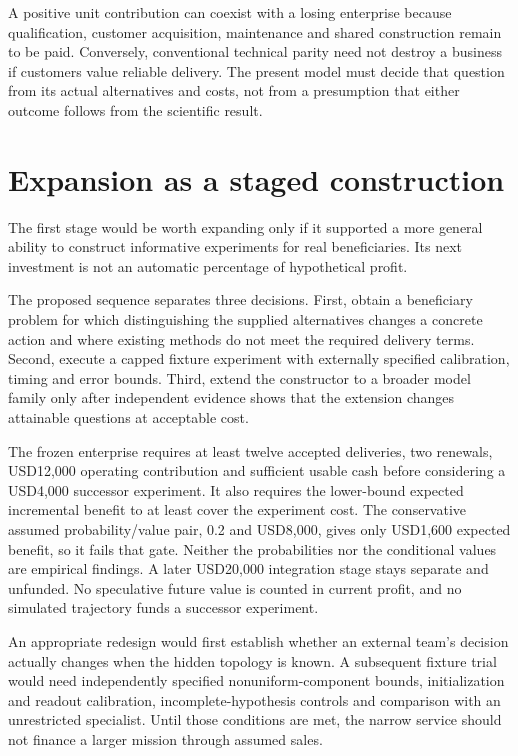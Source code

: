 \documentclass[
  11pt,
]{article}
\begin{document}
A positive unit contribution can coexist with a losing enterprise
because qualification, customer acquisition, maintenance and shared
construction remain to be paid. Conversely, conventional technical
parity need not destroy a business if customers value reliable delivery.
The present model must decide that question from its actual alternatives
and costs, not from a presumption that either outcome follows from the
scientific result.

\hypertarget{expansion-as-a-staged-construction}{%
\section{Expansion as a staged
construction}\label{expansion-as-a-staged-construction}}

The first stage would be worth expanding only if it supported a more
general ability to construct informative experiments for real
beneficiaries. Its next investment is not an automatic percentage of
hypothetical profit.

The proposed sequence separates three decisions. First, obtain a
beneficiary problem for which distinguishing the supplied alternatives
changes a concrete action and where existing methods do not meet the
required delivery terms. Second, execute a capped fixture experiment
with externally specified calibration, timing and error bounds. Third,
extend the constructor to a broader model family only after independent
evidence shows that the extension changes attainable questions at
acceptable cost.

The frozen enterprise requires at least twelve accepted deliveries, two
renewals, USD12,000 operating contribution and sufficient usable cash
before considering a USD4,000 successor experiment. It also requires the
lower-bound expected incremental benefit to at least cover the
experiment cost. The conservative assumed probability/value pair, 0.2
and USD8,000, gives only USD1,600 expected benefit, so it fails that
gate. Neither the probabilities nor the conditional values are empirical
findings. A later USD20,000 integration stage stays separate and
unfunded. No speculative future value is counted in current profit, and
no simulated trajectory funds a successor experiment.

An appropriate redesign would first establish whether an external team's
decision actually changes when the hidden topology is known. A
subsequent fixture trial would need independently specified
nonuniform-component bounds, initialization and readout calibration,
incomplete-hypothesis controls and comparison with an unrestricted
specialist. Until those conditions are met, the narrow service should
not finance a larger mission through assumed sales.
\end{document}
